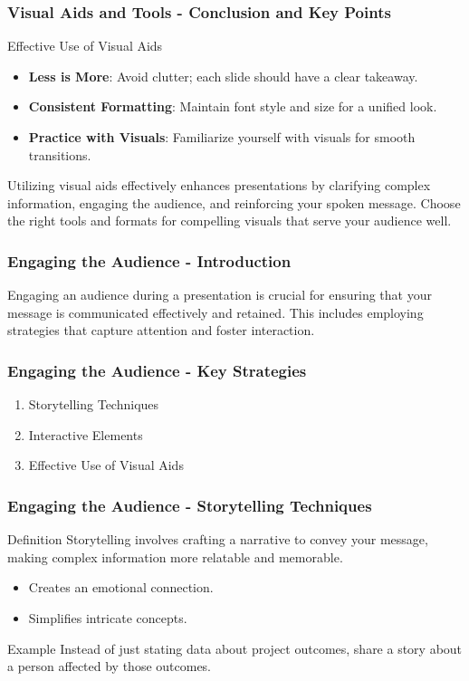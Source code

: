 \documentclass[aspectratio=169]{beamer}
\begin{document}
\begin{frame}[fragile]
    \frametitle{Visual Aids and Tools - Conclusion and Key Points}
    \begin{block}{Effective Use of Visual Aids}
        \begin{itemize}
            \item \textbf{Less is More}: Avoid clutter; each slide should have a clear takeaway.
            \item \textbf{Consistent Formatting}: Maintain font style and size for a unified look.
            \item \textbf{Practice with Visuals}: Familiarize yourself with visuals for smooth transitions.
        \end{itemize}
    \end{block}

    Utilizing visual aids effectively enhances presentations by clarifying complex information, engaging the audience, and reinforcing your spoken message. Choose the right tools and formats for compelling visuals that serve your audience well.
\end{frame}

\begin{frame}[fragile]
    \frametitle{Engaging the Audience - Introduction}
    Engaging an audience during a presentation is crucial for ensuring that your message is communicated effectively and retained. This includes employing strategies that capture attention and foster interaction.
\end{frame}

\begin{frame}[fragile]
    \frametitle{Engaging the Audience - Key Strategies}
    \begin{enumerate}
        \item Storytelling Techniques
        \item Interactive Elements
        \item Effective Use of Visual Aids
    \end{enumerate}
\end{frame}

\begin{frame}[fragile]
    \frametitle{Engaging the Audience - Storytelling Techniques}
    \begin{block}{Definition}
        Storytelling involves crafting a narrative to convey your message, making complex information more relatable and memorable.
    \end{block}
    \begin{itemize}
        \item Creates an emotional connection.
        \item Simplifies intricate concepts.
    \end{itemize}
    \begin{block}{Example}
        Instead of just stating data about project outcomes, share a story about a person affected by those outcomes.
    \end{block}
\end{frame}
\end{document}
